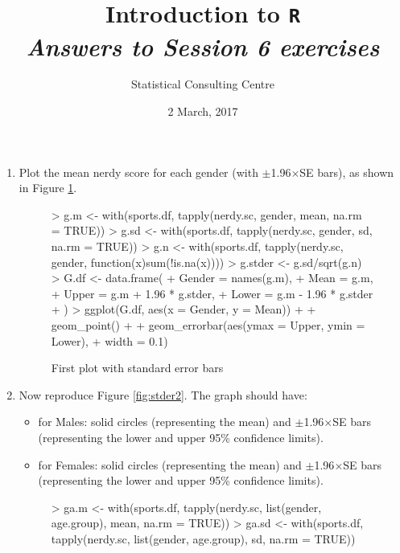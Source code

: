 \documentclass[12pt,a4paper]{article}
\begin{document}

\setlength\parindent{0cm}
\title{\Large{\textbf{Introduction to \texttt{R}}}\\
\textit{Answers to Session 6 exercises}}
\author{Statistical Consulting Centre}
\date{2 March, 2017}
\maketitle
 
\begin{enumerate}
\item Plot the mean nerdy score for each gender (with $\pm$1.96$\times$SE bars), as shown in Figure \ref{fig:stder1}. 
\begin{figure}[h]   
 \centering
\begin{Schunk}
\begin{Sinput}
> g.m <- with(sports.df, tapply(nerdy.sc, gender, mean, na.rm = TRUE))
> g.sd <- with(sports.df, tapply(nerdy.sc, gender, sd, na.rm = TRUE))
> g.n <- with(sports.df, tapply(nerdy.sc, gender, function(x)sum(!is.na(x))))
> g.stder <- g.sd/sqrt(g.n)
> G.df <- data.frame(
+   Gender = names(g.m),
+   Mean = g.m,
+   Upper = g.m + 1.96 * g.stder,
+   Lower = g.m - 1.96 * g.stder
+   )
> ggplot(G.df, aes(x = Gender, y = Mean)) + 
+   geom_point() +
+    geom_errorbar(aes(ymax = Upper, ymin = Lower),
+                 width = 0.1)
\end{Sinput}
\end{Schunk}
\caption{First plot with standard error bars}
  \label{fig:stder1}
\end{figure}
\newpage
\item Now reproduce Figure \ref{fig:stder2}. The graph should have:
\begin{itemize}
\item for Males: solid circles (representing the mean) and $\pm$1.96$\times$SE bars (representing the lower and upper 95\% confidence limits).
\item for Females: solid circles (representing the mean) and $\pm$1.96$\times$SE bars (representing the lower and upper 95\% confidence limits).
\end{itemize}
\begin{figure}[h]   
 \centering
\begin{Schunk}
\begin{Sinput}
> ga.m <- with(sports.df, tapply(nerdy.sc, list(gender, age.group), mean, na.rm = TRUE))
> ga.sd <- with(sports.df, tapply(nerdy.sc, list(gender, age.group), sd, na.rm = TRUE))

\end{Sinput}
\end{Schunk}
\end{figure}
\end{enumerate}
\end{document}
